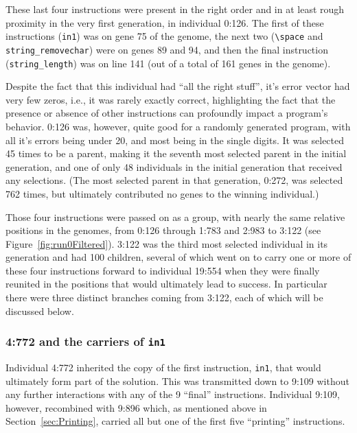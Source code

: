 These last four instructions were present in the right order and in at least
rough proximity in the very first generation, in individual 0:126. The first of these instructions (\texttt{in1}) was on gene 75 of the genome, the next two
(\texttt{\textbackslash space} and \texttt{string\_removechar}) were on 
genes 89 and 94, and then the final instruction (\texttt{string\_length}) 
was on line 141 (out of a total of 161 genes in the genome).

Despite the fact that this individual had ``all the right stuff'', it's error
vector had very few zeros, i.e., it was rarely exactly correct, highlighting
the fact that the presence or absence of other instructions can profoundly
impact a program's behavior. 0:126 was, however, quite good for a randomly
generated program, with all it's errors being under 20, and most being in
the single digits. It was selected 45 times to be a parent, making it the
seventh most selected parent in the initial generation, and one of only 48
individuals in the initial generation that received any selections. 
(The most selected
parent in that generation, 0:272, was selected 762 times, but ultimately
contributed no genes to the winning individual.)

Those four instructions were passed on as a group, with nearly the same 
relative positions in the genomes, from 0:126 through 1:783 and 2:983 
to 3:122 (see Figure~\ref{fig:run0Filtered}). 
3:122 was the third most selected individual in its generation
and had 100 children, several of which went on to carry one or more of
these four instructions forward to individual 19:554 when they were finally
reunited in the positions that would ultimately lead to success. In particular
there were three distinct branches coming from 3:122, each of which will
be discussed below.

\subsubsection{4:772 and the carriers of \texttt{in1}}
\label{sec:4:772}


Individual 4:772 inherited the copy of the first instruction,
\texttt{in1}, that would ultimately form part of the solution. This was
transmitted down to 9:109 without any further interactions with any of
the 9 ``final'' instructions. Individual 9:109, however, recombined with 
9:896 which, as mentioned above in Section~\ref{sec:Printing}, carried
all but one of the first five ``printing'' instructions. 

